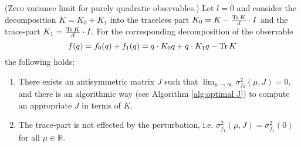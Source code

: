 \begin{lemma}
	\label{lem:optimal_perturbation}{(Zero variance limit for purely quadratic observables.)} Let $l=0$ and consider the decomposition $K=K_{0}+K_{1}$ into the traceless part $K_{0}=K-\frac{\operatorname{Tr} K}{d}\cdot I$ and the
	trace-part $K_{1}=\frac{\operatorname{Tr} K}{d}\cdot I.$ For the corresponding
	decomposition of the observable 
	\[
	f(q)=f_{0}(q)+f_{1}(q)=q\cdot K_{0}q+q\cdot K_{1}q-\operatorname{Tr} K
	\]
	the following holds:
	\begin{enumerate}[label=(\alph*)]
		\item There exists an antisymmetric matrix $J$ such that  $\lim_{\mu\rightarrow\infty}\sigma_{f_{0}}^{2}(\mu,J)=0,$
		and there is an algorithmic way (see Algorithm \ref{alg:optimal J}) to compute an appropriate $J$ in terms
		of $K$.
		\item The trace-part is not effected by the perturbation, i.e. $\sigma_{f_{1}}^{2}(\mu,J)=\sigma_{f_{1}}^{2}(0)$ for all $\mu\in\mathbb{R}$.
	\end{enumerate}
\end{lemma}
